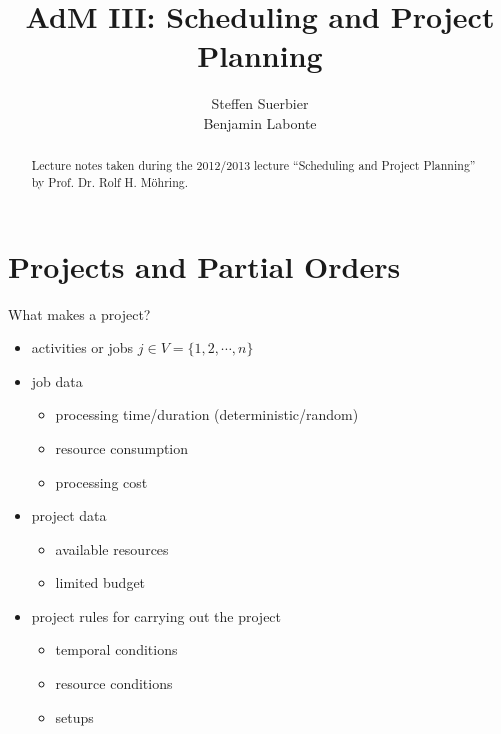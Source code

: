 \documentclass[11pt,a4paper,notitlepage]{article}
\author{Steffen Suerbier\\Benjamin Labonte}
\title{\sc AdM III: Scheduling and Project Planning}
\theoremstyle{plain}
\theoremstyle{definition}
\begin{document}

\maketitle

\begin{abstract}
Lecture notes taken during the 2012/2013 lecture ``Scheduling and Project Planning'' by Prof. Dr. Rolf H. Möhring.
\end{abstract}

\tableofcontents

\pagebreak


%



\section{Projects and Partial Orders} %
\label{sec:projects_and_partial_orders}

What makes a project?
\begin{itemize}
  \item activities or jobs $j\in V = \{1,2,\cdots,n\}$
  \item job data
  \begin{itemize}
    \item processing time/duration (deterministic/random)
    \item resource consumption
    \item processing cost
  \end{itemize}
  \item project data
  \begin{itemize}
    \item available resources
    \item limited budget
  \end{itemize}
  \item project rules for carrying out the project
  \begin{itemize}
    \item temporal conditions
    \item resource conditions
    \item setups
  \end{itemize}
\end{itemize}
\end{document}

